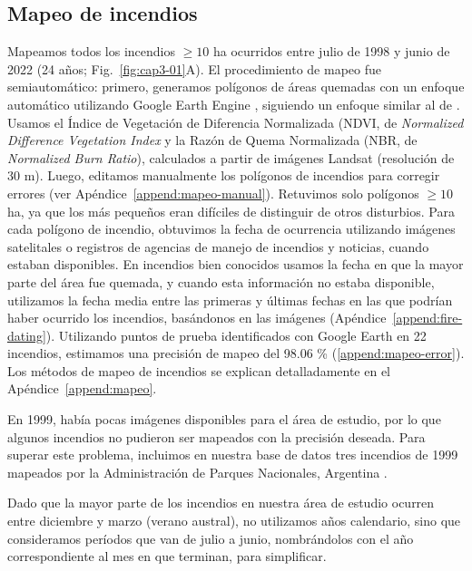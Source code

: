 \FloatBarrier

\subsection{Mapeo de incendios}

Mapeamos todos los incendios $\ge 10$ ha ocurridos entre julio de 1998 y junio de 2022 (24 años; Fig.~\ref{fig:cap3-01}A). El procedimiento de mapeo fue semiautomático: primero, generamos polígonos de áreas quemadas con un enfoque automático utilizando Google Earth Engine \citep{gorelick_google_2017}, siguiendo un enfoque similar al de \citet{long2019}. Usamos el Índice de Vegetación de Diferencia Normalizada (NDVI, de \textit{Normalized Difference Vegetation Index} y la Razón de Quema Normalizada (NBR, de \textit{Normalized Burn Ratio}), calculados a partir de imágenes Landsat (resolución de 30 m). Luego, editamos manualmente los polígonos de incendios para corregir errores (ver Apéndice~\ref{append:mapeo-manual}). Retuvimos solo polígonos $\ge 10$ ha, ya que los más pequeños eran difíciles de distinguir de otros disturbios. Para cada polígono de incendio, obtuvimos la fecha de ocurrencia utilizando imágenes satelitales o registros de agencias de manejo de incendios y noticias, cuando estaban disponibles. En incendios bien conocidos usamos la fecha en que la mayor parte del área fue quemada, y cuando esta información no estaba disponible, utilizamos la fecha media entre las primeras y últimas fechas en las que podrían haber ocurrido los incendios, basándonos en las imágenes (Apéndice~\ref{append:fire-dating}). Utilizando puntos de prueba identificados con Google Earth en 22 incendios, estimamos una precisión de mapeo del 98.06 \% (\ref{append:mapeo-error}). Los métodos de mapeo de incendios se explican detalladamente en el Apéndice~\ref{append:mapeo}.

En 1999, había pocas imágenes disponibles para el área de estudio, por lo que algunos incendios no pudieron ser mapeados con la precisión deseada. Para superar este problema, incluimos en nuestra base de datos tres incendios de 1999 mapeados por la Administración de Parques Nacionales, Argentina \citep{mermoz_deteccion_2002}.

Dado que la mayor parte de los incendios en nuestra área de estudio ocurren entre diciembre y marzo (verano austral), no utilizamos años calendario, sino que consideramos períodos que van de julio a junio, nombrándolos con el año correspondiente al mes en que terminan, para simplificar.

